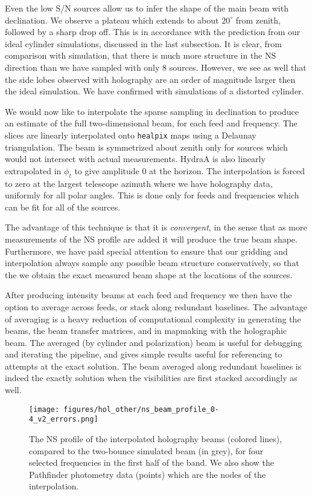 Even the low S/N sources allow us to infer the shape of the main beam with declination. We observe a plateau which extends to about $20^{\circ}$ from zenith, followed by a sharp drop off. This is in accordance with the prediction from our ideal cylinder simulations, discussed in the last subsection. It is clear, from comparison with simulation, that there is much more structure in the NS direction than we have sampled with only 8 sources. However, we see as well that the side lobes observed with holography are an order of magnitude larger then the ideal simulation. We have confirmed with simulations of a distorted cylinder.

We would now like to interpolate the sparse sampling in declination to produce an estimate of the full two-dimensional beam, for each feed and frequency. The slices are linearly interpolated onto \texttt{healpix} maps using a Delaunay triangulation. The beam is symmetrized about zenith only for sources which would not intersect with actual measurements. HydraA is also linearly extrapolated in $\phi_t$ to give amplitude 0 at the horizon. The interpolation is forced to zero at the largest telescope azimuth where we have holography data, uniformly for all polar angles. This is done only for feeds and frequencies which can be fit for all of the sources.

The advantage of this technique is that it is \textit{convergent}, in the sense that as more measurements of the NS profile are added it will produce the true beam shape. Furthermore, we have paid special attention to ensure that our gridding and interpolation always sample any possible beam structure conservatively, so that the we obtain the exact measured beam shape at the locations of the sources.

After producing intensity beams at each feed and frequency we then have the option to average across feeds, or stack along redundant baselines. The advantage of averaging is a heavy reduction of computational complexity in generating the beams, the beam transfer matrices, and in mapmaking with the holographic beam. The averaged (by cylinder and polarization) beam is useful for debugging and iterating the pipeline, and gives simple results useful for referencing to attempts at the exact solution. The beam averaged along redundant baselines is indeed the exactly solution when the visibilities are first stacked accordingly as well.

\begin{figure}[h!]
\begin{center}
\texttt{[image: figures/hol\_other/ns\_beam\_profile\_0-4\_v2\_errors.png]}
\caption{The NS profile of the interpolated holography beams (colored lines), compared to the two-bounce simulated beam (in grey), for four selected frequencies in the first half of the band. We also show the Pathfinder photometry data (points) which are the nodes of the interpolation. \label{nsprof0}}
\end{center}
\end{figure}

